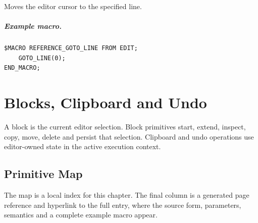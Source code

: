 \documentclass[a4paper,10pt,twoside,openany]{book}
\begin{document}
Moves the editor cursor to the specified line.

\paragraph{Example macro.}
\begin{verbatim}
$MACRO REFERENCE_GOTO_LINE FROM EDIT;
    GOTO_LINE(0);
END_MACRO;
\end{verbatim}


\chapter{Blocks, Clipboard and Undo}

A block is the current editor selection. Block primitives start, extend, inspect, copy, move, delete and persist that selection. Clipboard and undo operations use editor-owned state in the active execution context.

\section{Primitive Map}
The map is a local index for this chapter. The final column is a generated page
reference and hyperlink to the full entry, where the source form, parameters,
semantics and a complete example macro appear.
\end{document}
